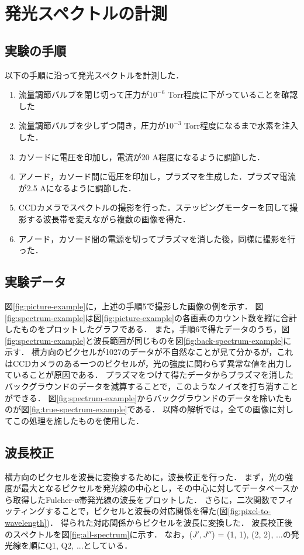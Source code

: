 \chapter{発光スペクトルの計測}
\section{実験の手順}
以下の手順に沿って発光スペクトルを計測した．
\begin{enumerate}
    \item 流量調節バルブを閉じ切って圧力が$10^{-6}$ Torr程度に下がっていることを確認した
    \item 流量調節バルブを少しずつ開き，圧力が$10^{-3}$ Torr程度になるまで水素を注入した．
    \item カソードに電圧を印加し，電流が20 A程度になるように調節した．
    \item アノード，カソード間に電圧を印加し，プラズマを生成した．プラズマ電流が2.5 Aになるように調節した．
    \item CCDカメラでスペクトルの撮影を行った．ステッピングモーターを回して撮影する波長帯を変えながら複数の画像を得た．
    \item アノード，カソード間の電源を切ってプラズマを消した後，同様に撮影を行った．
\end{enumerate}

\section{実験データ}
図\ref{fig:picture-example}に，上述の手順5で撮影した画像の例を示す．
図\ref{fig:spectrum-example}は図\ref{fig:picture-example}の各画素のカウント数を縦に合計したものをプロットしたグラフである．
また，手順6で得たデータのうち，図\ref{fig:spectrum-example}と波長範囲が同じものを図\ref{fig:back-spectrum-example}に示す．
横方向のピクセルが1027のデータが不自然なことが見て分かるが，これはCCDカメラのある一つのピクセルが，光の強度に関わらず異常な値を出力していることが原因である．
プラズマをつけて得たデータからプラズマを消したバックグラウンドのデータを減算することで，このようなノイズを打ち消すことができる．
図\ref{fig:spectrum-example}からバックグラウンドのデータを除いたものが図\ref{fig:true-spectrum-example}である．
以降の解析では，全ての画像に対してこの処理を施したものを使用した．

\section{波長校正}
横方向のピクセルを波長に変換するために，波長校正を行った．
まず，光の強度が最大となるピクセルを発光線の中心とし，その中心に対してデータベース\cite{H2-spectrum-data}から取得したFulcher-α帯発光線の波長をプロットした．
さらに，二次関数でフィッティングすることで，ピクセルと波長の対応関係を得た(図\ref{fig:pixel-to-wavelength})．
得られた対応関係からピクセルを波長に変換した．
波長校正後のスペクトルを図\ref{fig:all-spectrum}に示す．
なお，($J', J''$) = (1, 1), (2, 2), ...の発光線を順にQ1, Q2, ...としている．